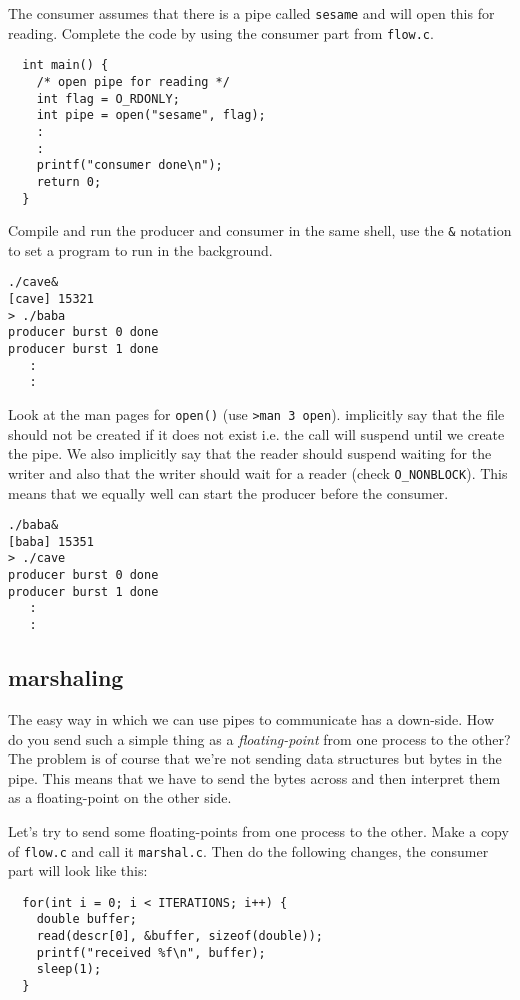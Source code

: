 \documentclass[a4paper,11pt]{article}
\begin{document}
The consumer assumes that there is a pipe called {\tt sesame} and will
open this for reading. Complete the code by using the consumer part
from {\tt flow.c}.

\begin{lstlisting}
  int main() {
    /* open pipe for reading */
    int flag = O_RDONLY;  
    int pipe = open("sesame", flag);
    :
    :
    printf("consumer done\n");
    return 0;
  }
\end{lstlisting}

Compile and run the producer and consumer in the same shell, use the
{\tt \&} notation to set a program to run in the background.

\begin{verbatim}
./cave&
[cave] 15321
> ./baba 
producer burst 0 done
producer burst 1 done
   :
   :
\end{verbatim}

Look at the man pages for {\tt open()} (use {\tt >man 3 open}).
implicitly say that the file should not be created if it does not exist
i.e. the call will suspend until we create the pipe. We also implicitly
say that the reader should suspend waiting for the writer and also
that the writer should wait for a reader (check {\tt O\_NONBLOCK}).
This means that we equally well can start the producer before the
consumer.

\begin{verbatim}
./baba&
[baba] 15351
> ./cave 
producer burst 0 done
producer burst 1 done
   :
   :
\end{verbatim}

\subsection{marshaling}

The easy way in which we can use pipes to communicate has a
down-side. How do you send such a simple thing as a {\em floating-point} from one
process to the other? The problem is of course that we're not sending
data structures but bytes in the pipe. This means that we have to send
the bytes across and then interpret them as a floating-point on the other
side.

Let's try to send some floating-points from one process to the
other. Make a copy of {\tt flow.c} and call it {\tt marshal.c}. Then
do the following changes, the consumer part will look like this:

\begin{lstlisting}
  for(int i = 0; i < ITERATIONS; i++) {
    double buffer;
    read(descr[0], &buffer, sizeof(double));
    printf("received %f\n", buffer);
    sleep(1);
  }
\end{lstlisting}
\end{document}
